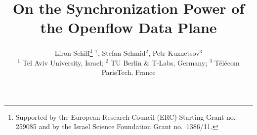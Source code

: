 \documentclass[conference]{sigcomm-alternate}
\begin{document}
\sloppy





\title{On the Synchronization Power of the Openflow Data Plane}




\author{
Liron Schiff\thanks{Supported by the European Research Council (ERC) Starting Grant no. 259085 and by the Israel Science Foundation Grant no.~1386/11.} $^1$,
Stefan Schmid$^2$, Petr Kuznetsov$^3$ \\
\small $^1$ Tel Aviv University, Israel; $^2$ TU Berlin \& T-Labs,
Germany; $^3$ T\'el\'ecom ParisTech, France
}


\date{}


\maketitle


\thispagestyle{empty}


\end{document}
